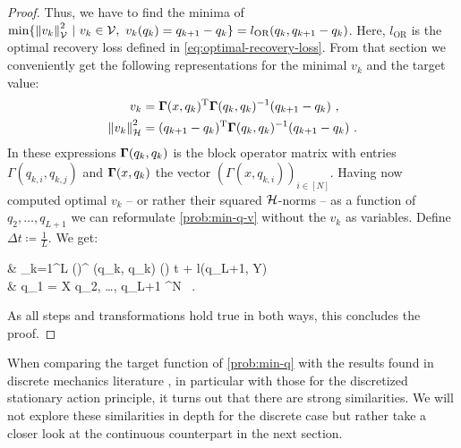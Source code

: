 \begin{proof}
	Thus, we have to find the minima of $\min\{\norm{v_k}_{\mathcal{V}}^2\ |\ v_k \in \mathcal{V},\ v_k(q_k) = q_{k+1} - q_k\} = l_{\text{OR}}(q_k, q_{k+1} - q_k)$.
	Here, $l_{\text{OR}}$ is the optimal recovery loss defined in \cref{eq:optimal-recovery-loss}.
	From that section we conveniently get the following representations for the minimal $v_k$ and the target value:
	\begin{align}
		v_k & = \mathbf{\Gamma}(x, q_k)^\mathrm{T}\mathbf{\Gamma}(q_k, q_k)^{-1} (q_{k+1} - q_k) \ ,\\
		\norm{v_k}_{\mathcal{H}}^2 &= (q_{k+1} - q_k)^\mathrm{T} \mathbf{\Gamma}(q_k, q_k)^{-1} (q_{k+1} - q_k) \ .
	\end{align}
	In these expressions $\mathbf{\Gamma}(q_k, q_k)$ is the block operator matrix with entries $\Gamma(q_{k,i}, q_{k, j})$ and $\mathbf{\Gamma}(x, q_k)$ the vector $(\Gamma(x, q_{k, i}))_{i \in [N]}$.
	Having now computed optimal $v_k$ -- or rather their squared $\mathcal{H}$-norms -- as a function of $q_2, \ldots, q_{L+1}$ we can reformulate \cref{prob:min-q-v} without the $v_k$ as variables.
	Define $\Delta t \coloneqq \frac{1}{L}$.
	We get:
	\begin{problem}
		\begin{cases}
			 & \nu \cdot {} \sum_{k=1}^{L}  
			\left(\right)^ \bGamma(q_k, q_k)
			\left(\right) \cdot \Delta t
			+ l(q_{L+1}, Y) \\
			 & q_1 = X  q_2, \ldots, q_{L+1} \in \cX^N \ .
		\end{cases}
	\end{problem}
	As all steps and transformations hold true in both ways, this concludes the proof.
\end{proof}

When comparing the target function of \cref{prob:min-q} with the results found in discrete mechanics literature \cite[~Chapter VI.6.2]{hairer06}, in particular with those for the discretized stationary action principle, it turns out that there are strong similarities.
We will not explore these similarities in depth for the discrete case but rather take a closer look at the continuous counterpart in the next section.